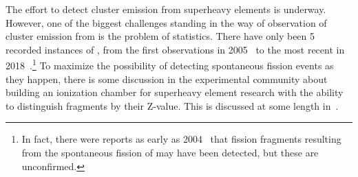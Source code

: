 The effort to detect cluster emission from superheavy elements is underway. However, one of the biggest challenges standing in the way of observation of cluster emission from {\Og} is the problem of statistics. There have only been 5 recorded instances of {\Og}, from the first observations in 2005~\cite{Oganessian2006} to the most recent in 2018~\cite{Brewer2018}.\footnote{In fact, there were reports as early as 2004~\cite{Oganessian2004} that fission fragments resulting from the spontaneous fission of {\Og} may have been detected, but these are unconfirmed.} To maximize the possibility of detecting spontaneous fission events as they happen, there is some discussion in the experimental community about building an ionization chamber for superheavy element research with the ability to distinguish fragments by their Z-value. This is discussed at some length in~\cite{Brewer2018}.

%

